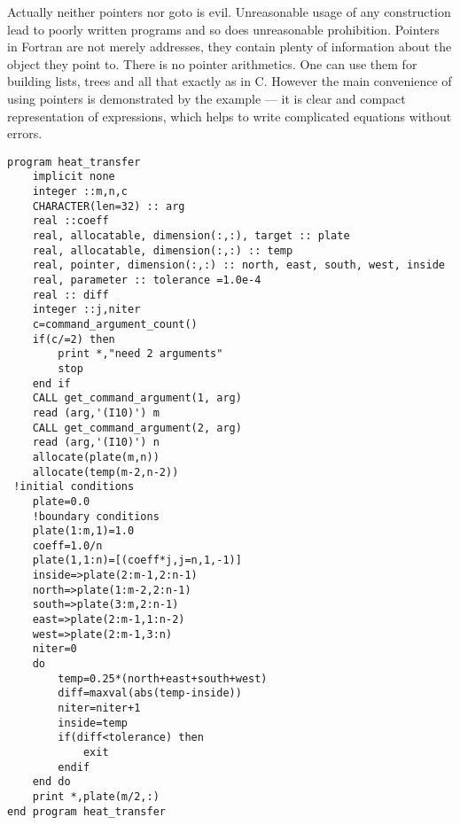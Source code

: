 \documentclass[a4paper]{article}
\begin{document}
Actually neither pointers nor goto is evil. Unreasonable usage of any construction lead to poorly written programs and so does unreasonable prohibition. Pointers in Fortran are not merely addresses, they contain plenty of information about the object they point to. There is no pointer arithmetics. One can use them for building lists, trees and all that exactly as in C. However the main convenience of using pointers is demonstrated by the example --- it is clear and compact representation of expressions, which helps to write complicated equations without errors. 
\begin{verbatim} 
program heat_transfer
    implicit none
    integer ::m,n,c
    CHARACTER(len=32) :: arg
    real ::coeff
    real, allocatable, dimension(:,:), target :: plate
    real, allocatable, dimension(:,:) :: temp
    real, pointer, dimension(:,:) :: north, east, south, west, inside
    real, parameter :: tolerance =1.0e-4    
    real :: diff
    integer ::j,niter
    c=command_argument_count()
    if(c/=2) then
        print *,"need 2 arguments"
        stop
    end if    
    CALL get_command_argument(1, arg)
    read (arg,'(I10)') m
    CALL get_command_argument(2, arg)
    read (arg,'(I10)') n
    allocate(plate(m,n))
    allocate(temp(m-2,n-2))
 !initial conditions
    plate=0.0
    !boundary conditions
    plate(1:m,1)=1.0
    coeff=1.0/n
    plate(1,1:n)=[(coeff*j,j=n,1,-1)]
    inside=>plate(2:m-1,2:n-1)
    north=>plate(1:m-2,2:n-1)
    south=>plate(3:m,2:n-1)
    east=>plate(2:m-1,1:n-2)
    west=>plate(2:m-1,3:n)
    niter=0
    do
        temp=0.25*(north+east+south+west)
        diff=maxval(abs(temp-inside))
        niter=niter+1
        inside=temp
        if(diff<tolerance) then
            exit
        endif
    end do
    print *,plate(m/2,:)
end program heat_transfer
\end{verbatim}
 
\end{document}
